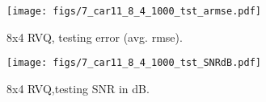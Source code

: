 								\begin{figure}[h!]
								\centering
								\texttt{[image: figs/7\_car11\_8\_4\_1000\_tst\_armse.pdf]}
								\caption{8x4 RVQ, testing error (avg. rmse).}
								\label{fig:7_car11_8_4_1000_tst_armse}
								\end{figure}

								\begin{figure}[h!]
								\centering
								\texttt{[image: figs/7\_car11\_8\_4\_1000\_tst\_SNRdB.pdf]}
								\caption{8x4 RVQ,testing SNR in dB.}
								\label{fig:7_car11_8_4_1000_tst_SNRdB}
								\end{figure}
